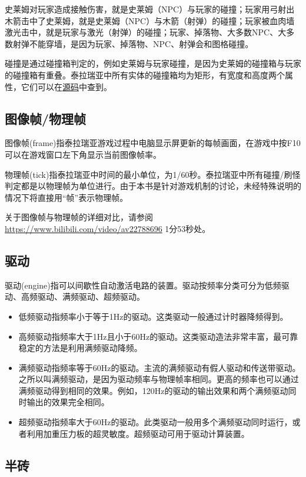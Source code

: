 史莱姆对玩家造成接触伤害，就是史莱姆（NPC）与玩家的碰撞；玩家用弓射出木箭击中了史莱姆，就是史莱姆（NPC）与木箭（射弹）的碰撞；玩家被血肉墙激光击中，就是玩家与激光（射弹）的碰撞；玩家、掉落物、大多数NPC、大多数射弹不能穿墙，是因为玩家、掉落物、NPC、射弹会和图格碰撞。

碰撞是通过碰撞箱判定的，例如史莱姆与玩家碰撞，是因为史莱姆的碰撞箱与玩家的碰撞箱有重叠。泰拉瑞亚中所有实体的碰撞箱均为矩形，有宽度和高度两个属性，它们可以在\hyperref[app8]{源码}中查到。

\subsection{图像帧/物理帧}

图像帧(frame)指泰拉瑞亚游戏过程中电脑显示屏更新的每帧画面，在游戏中按F10可以在游戏窗口左下角显示当前图像帧率。

物理帧(tick)指泰拉瑞亚中时间的最小单位，为1/60秒。泰拉瑞亚中所有碰撞/刷怪判定都是以物理帧为单位进行。由于本书是针对游戏机制的讨论，未经特殊说明的情况下将直接用“帧”表示物理帧。

关于图像帧与物理帧的详细对比，请参阅\url{https://www.bilibili.com/video/av22788696} 1分53秒处。

\subsection{驱动}

驱动(engine)指可以间歇性自动激活电路的装置。驱动按频率分类可分为低频驱动、高频驱动、满频驱动、超频驱动。

\begin{itemize}
\item 低频驱动指频率小于等于1Hz的驱动。这类驱动一般通过计时器降频得到。
\item 高频驱动指频率大于1Hz且小于60Hz的驱动。这类驱动造法非常丰富，最可靠稳定的方法是利用满频驱动降频。
\item 满频驱动指频率等于60Hz的驱动。主流的满频驱动有假人驱动和传送带驱动。之所以叫满频驱动，是因为驱动频率与物理帧率相同。更高的频率也可以通过满频驱动得到相同的效果。例如，120Hz的驱动的输出效果和两个满频驱动同时输出的效果完全相同。
\item 超频驱动指频率大于60Hz的驱动。此类驱动一般用多个满频驱动同时运行，或者利用加重压力板的超灵敏度。超频驱动可用于驱动计算装置。
\end{itemize}

\subsection{半砖}

